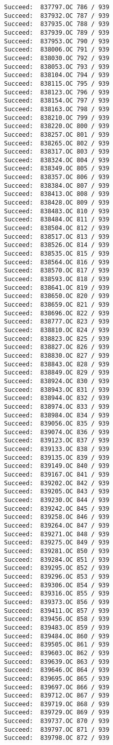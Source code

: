 \documentclass[11pt]{article}
\begin{document}
\begin{verbatim}
Succeed:  837797.OC 786 / 939
Succeed:  837932.OC 787 / 939
Succeed:  837935.OC 788 / 939
Succeed:  837939.OC 789 / 939
Succeed:  837953.OC 790 / 939
Succeed:  838006.OC 791 / 939
Succeed:  838030.OC 792 / 939
Succeed:  838053.OC 793 / 939
Succeed:  838104.OC 794 / 939
Succeed:  838115.OC 795 / 939
Succeed:  838123.OC 796 / 939
Succeed:  838154.OC 797 / 939
Succeed:  838163.OC 798 / 939
Succeed:  838210.OC 799 / 939
Succeed:  838220.OC 800 / 939
Succeed:  838257.OC 801 / 939
Succeed:  838265.OC 802 / 939
Succeed:  838317.OC 803 / 939
Succeed:  838324.OC 804 / 939
Succeed:  838349.OC 805 / 939
Succeed:  838357.OC 806 / 939
Succeed:  838384.OC 807 / 939
Succeed:  838413.OC 808 / 939
Succeed:  838428.OC 809 / 939
Succeed:  838483.OC 810 / 939
Succeed:  838484.OC 811 / 939
Succeed:  838504.OC 812 / 939
Succeed:  838517.OC 813 / 939
Succeed:  838526.OC 814 / 939
Succeed:  838535.OC 815 / 939
Succeed:  838564.OC 816 / 939
Succeed:  838570.OC 817 / 939
Succeed:  838593.OC 818 / 939
Succeed:  838641.OC 819 / 939
Succeed:  838650.OC 820 / 939
Succeed:  838659.OC 821 / 939
Succeed:  838696.OC 822 / 939
Succeed:  838777.OC 823 / 939
Succeed:  838810.OC 824 / 939
Succeed:  838823.OC 825 / 939
Succeed:  838827.OC 826 / 939
Succeed:  838830.OC 827 / 939
Succeed:  838843.OC 828 / 939
Succeed:  838849.OC 829 / 939
Succeed:  838924.OC 830 / 939
Succeed:  838943.OC 831 / 939
Succeed:  838944.OC 832 / 939
Succeed:  838974.OC 833 / 939
Succeed:  838984.OC 834 / 939
Succeed:  839056.OC 835 / 939
Succeed:  839074.OC 836 / 939
Succeed:  839123.OC 837 / 939
Succeed:  839133.OC 838 / 939
Succeed:  839135.OC 839 / 939
Succeed:  839149.OC 840 / 939
Succeed:  839167.OC 841 / 939
Succeed:  839202.OC 842 / 939
Succeed:  839205.OC 843 / 939
Succeed:  839230.OC 844 / 939
Succeed:  839242.OC 845 / 939
Succeed:  839258.OC 846 / 939
Succeed:  839264.OC 847 / 939
Succeed:  839271.OC 848 / 939
Succeed:  839275.OC 849 / 939
Succeed:  839281.OC 850 / 939
Succeed:  839284.OC 851 / 939
Succeed:  839295.OC 852 / 939
Succeed:  839296.OC 853 / 939
Succeed:  839306.OC 854 / 939
Succeed:  839316.OC 855 / 939
Succeed:  839373.OC 856 / 939
Succeed:  839411.OC 857 / 939
Succeed:  839456.OC 858 / 939
Succeed:  839483.OC 859 / 939
Succeed:  839484.OC 860 / 939
Succeed:  839505.OC 861 / 939
Succeed:  839603.OC 862 / 939
Succeed:  839639.OC 863 / 939
Succeed:  839646.OC 864 / 939
Succeed:  839695.OC 865 / 939
Succeed:  839697.OC 866 / 939
Succeed:  839712.OC 867 / 939
Succeed:  839719.OC 868 / 939
Succeed:  839729.OC 869 / 939
Succeed:  839737.OC 870 / 939
Succeed:  839797.OC 871 / 939
Succeed:  839798.OC 872 / 939

\end{verbatim}
\end{document}
